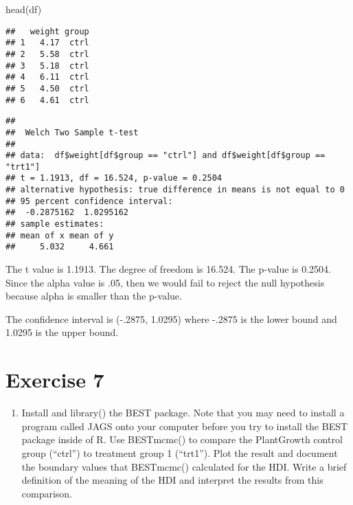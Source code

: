 \documentclass[
]{article}
\newenvironment{Shaded}{\begin{snugshade}}{\end{snugshade}}
\newcommand{\FunctionTok}[1]{\textcolor[rgb]{0.00,0.00,0.00}{#1}}
\newcommand{\NormalTok}[1]{#1}
\newcommand{\SpecialCharTok}[1]{\textcolor[rgb]{0.00,0.00,0.00}{#1}}
\newcommand{\StringTok}[1]{\textcolor[rgb]{0.31,0.60,0.02}{#1}}
\providecommand{\tightlist}{%
  \setlength{\itemsep}{0pt}\setlength{\parskip}{0pt}}
\begin{document}
\begin{Shaded}
\begin{Highlighting}[]
\FunctionTok{head}\NormalTok{(df)}
\end{Highlighting}
\end{Shaded}

\begin{verbatim}
##   weight group
## 1   4.17  ctrl
## 2   5.58  ctrl
## 3   5.18  ctrl
## 4   6.11  ctrl
## 5   4.50  ctrl
## 6   4.61  ctrl
\end{verbatim}

\begin{Shaded}
\end{Shaded}

\begin{verbatim}
## 
##  Welch Two Sample t-test
## 
## data:  df$weight[df$group == "ctrl"] and df$weight[df$group == "trt1"]
## t = 1.1913, df = 16.524, p-value = 0.2504
## alternative hypothesis: true difference in means is not equal to 0
## 95 percent confidence interval:
##  -0.2875162  1.0295162
## sample estimates:
## mean of x mean of y 
##     5.032     4.661
\end{verbatim}

The t value is 1.1913. The degree of freedom is 16.524. The p-value is
0.2504. Since the alpha value is .05, then we would fail to reject the
null hypothesis because alpha is smaller than the p-value.

The confidence interval is (-.2875, 1.0295) where -.2875 is the lower
bound and 1.0295 is the upper bound.

\hypertarget{exercise-7}{%
\section{Exercise 7}\label{exercise-7}}

\begin{enumerate}
\def\labelenumi{\arabic{enumi}.}
\setcounter{enumi}{6}
\tightlist
\item
  Install and library() the BEST package. Note that you may need to
  install a program called JAGS onto your computer before you try to
  install the BEST package inside of R. Use BESTmcmc() to compare the
  PlantGrowth control group (``ctrl'') to treatment group 1 (``trt1'').
  Plot the result and document the boundary values that BESTmcmc()
  calculated for the HDI. Write a brief definition of the meaning of the
  HDI and interpret the results from this comparison.
\end{enumerate}
\end{document}
